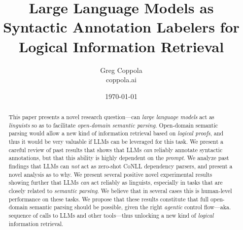 \documentclass[11pt]{article}
\title{Large Language Models as Syntactic Annotation Labelers for Logical Information Retrieval}
\author{Greg Coppola\\coppola.ai}
\date{\today}
\begin{document}
\maketitle

\begin{abstract}
    This paper presents a novel research question---can {\em large language models} act as {\em linguists} so as to facilitate {\em open-domain semantic parsing}.
    Open-domain semantic parsing would allow a new kind of information retrieval based on {\em logical proofs}, and thus it would be very valuable if LLMs can be leveraged for this task.
    We present a careful review of past results that shows that LLMs {\em can} reliably annotate syntactic annotations, but that this ability is highly dependent on the {\em prompt}.
    We analyze past findings that LLMs can {\em not} act as zero-shot CoNLL dependency parsers, and present a novel analysis as to why.
    We present several positive novel experimental results showing further that LLMs {\em can} act reliably as linguists, especially in tasks that are closely related to {\em semantic parsing}.
    We believe that in several cases this is human-level performance on these tasks.
    We propose that these results constitute that full open-domain semantic parsing should be possible, given the right {\em agentic} control flow---aka. sequence of calls to LLMs and other tools---thus unlocking a new kind of {\em logical} information retrieval.
\end{abstract}
\end{document}
